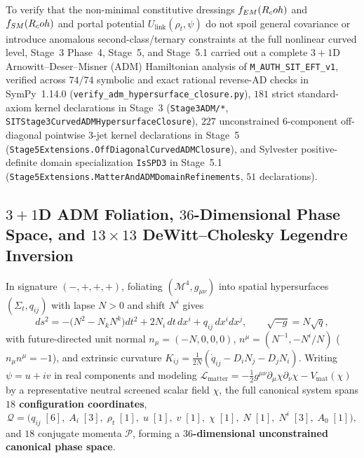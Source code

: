 To verify that the non-minimal constitutive dressings $f_{EM}(R_coh)$ and $f_{SM}(R_coh)$ and portal potential $U_{\mathrm{link}}(\rho_t, \psi)$ do not spoil general covariance or introduce anomalous second-class/ternary constraints at the full nonlinear curved level, Stage~3 Phase~4, Stage~5, and Stage~5.1 carried out a complete $3+1$D Arnowitt--Deser--Misner (ADM) Hamiltonian analysis of \texttt{M\_AUTH\_SIT\_EFT\_v1}, verified across $74/74$ symbolic and exact rational reverse-AD checks in SymPy~1.14.0 (\texttt{verify\_\allowbreak{}adm\_\allowbreak{}hypersurface\_\allowbreak{}closure.\allowbreak{}py}), $181$ strict standard-axiom kernel declarations in Stage~3 (\texttt{Stage3ADM/*}, \texttt{SITStage3\allowbreak{}Curved\allowbreak{}ADMHypersurface\allowbreak{}Closure}), $227$ unconstrained 6-component off-diagonal pointwise 3-jet kernel declarations in Stage~5 (\texttt{Stage5\allowbreak{}Extensions.\allowbreak{}Off\allowbreak{}Diagonal\allowbreak{}Curved\allowbreak{}ADMClosure}), and Sylvester positive-definite domain specialization \texttt{IsSPD3} in Stage~5.1 (\texttt{Stage5\allowbreak{}Extensions.\allowbreak{}Matter\allowbreak{}And\allowbreak{}ADMDomain\allowbreak{}Refinements}, $51$ declarations).

\subsection{$3+1$D ADM Foliation, $36$-Dimensional Phase Space, and $13\times 13$ DeWitt--Cholesky Legendre Inversion}

In signature $(-,+,+,+)$, foliating $(\mathcal{M}^4, g_{\mu\nu})$ into spatial hypersurfaces $(\Sigma_t, q_{ij})$ with lapse $N > 0$ and shift $N^i$ gives
\begin{equation}
ds^2 = -\bigl(N^2 - N_k N^k\bigr)dt^2 + 2 N_i\,dt\,dx^i + q_{ij}\,dx^i dx^j,
\qquad
\sqrt{-g} = N\sqrt{q},
\label{eq:adm_metric_foliation}
\end{equation}
with future-directed unit normal $n_\mu = (-N,0,0,0)$, $n^\mu = (N^{-1}, -N^i/N)$ ($n_\mu n^\mu = -1$), and extrinsic curvature $K_{ij} = \frac{1}{2N}(\dot{q}_{ij} - D_i N_j - D_j N_i)$. Writing $\psi = u + iv$ in real components and modeling $\mathcal{L}_{\mathrm{matter}} = -\frac{1}{2}g^{\mu\nu}\partial_\mu\chi\partial_\nu\chi - V_{\mathrm{mat}}(\chi)$ by a representative neutral screened scalar field $\chi$, the full canonical system spans \textbf{$18$ configuration coordinates},
\[
\mathcal{Q} = \bigl(q_{ij}\;[6],\; A_i\;[3],\; \rho_t\;[1],\; u\;[1],\; v\;[1],\; \chi\;[1],\; N\;[1],\; N^i\;[3],\; A_0\;[1]\bigr),
\]
and $18$ conjugate momenta $\mathcal{P}$, forming a \textbf{$36$-dimensional unconstrained canonical phase space}.

